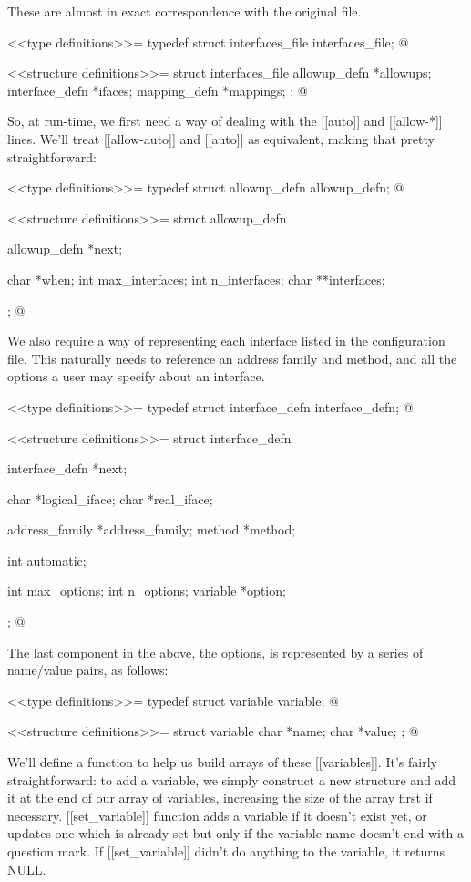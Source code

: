 \documentclass{article}
\begin{document}
 These are almost in exact correspondence with the original file.

<<type definitions>>=
typedef struct interfaces_file interfaces_file;
@ 

<<structure definitions>>=
struct interfaces_file {
	allowup_defn *allowups;
	interface_defn *ifaces;
	mapping_defn *mappings;
};
@

So, at run-time, we first need a way of dealing with the [[auto]] and
[[allow-*]] lines. We'll treat [[allow-auto]] and [[auto]] as equivalent,
making that pretty straightforward:

<<type definitions>>=
typedef struct allowup_defn allowup_defn;
@

<<structure definitions>>=
struct allowup_defn {
	allowup_defn *next;

	char *when;
	int max_interfaces;
	int n_interfaces;
	char **interfaces;
};
@ 

We also require a way of representing each interface listed in the
configuration file. This naturally needs to reference an address family
and method, and all the options a user may specify about an interface.

<<type definitions>>=
typedef struct interface_defn interface_defn;
@ 

<<structure definitions>>=
struct interface_defn {
	interface_defn *next;

	char *logical_iface;
	char *real_iface;

	address_family *address_family;
	method *method;

	int automatic;

	int max_options;
	int n_options;
	variable *option;
};
@

The last component in the above, the options, is represented by a
series of name/value pairs, as follows:

<<type definitions>>=
typedef struct variable variable;
@ 

<<structure definitions>>=
struct variable {
	char *name;
	char *value;
};
@ 

We'll define a function to help us build arrays of these [[variables]].
It's fairly straightforward: to add a variable, we simply construct
a new structure and add it at the end of our array of variables,
increasing the size of the array first if necessary. [[set_variable]]
function adds a variable if it doesn't exist yet, or updates one which
is already set but only if the variable name doesn't end with a question
mark. If [[set_variable]] didn't do anything to the variable, it returns
NULL.
\end{document}
